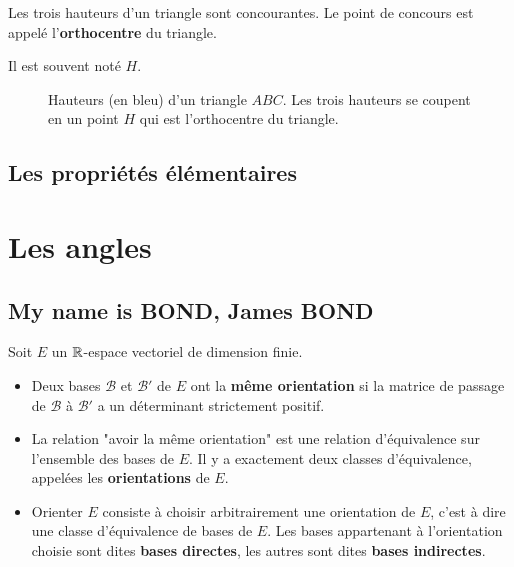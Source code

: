 \documentclass[a4paper,12pt]{article}
\begin{document}
\begin{theoreme}{}{}
    Les trois hauteurs d'un triangle sont concourantes. Le point de concours est appelé l'\textbf{orthocentre} du triangle.
    
    Il est souvent noté $H$.
\end{theoreme}

\tikzexternalenable
\begin{figure}[H]
    \centering
    \resizebox{0.6\textwidth}{!}{%
    
    }
    \caption{Hauteurs (en bleu) d'un triangle $ABC$. Les trois hauteurs se coupent en un point $H$ qui est l'orthocentre du triangle.}
\end{figure}
\tikzexternaldisable

\subsection{Les propriétés élémentaires}

\clearpage

\section{Les angles}

\subsection{My name is BOND, James BOND}

\begin{definition}
    Soit $E$ un $\mathbb{R}$-espace vectoriel de dimension finie.

    \begin{itemize}
        \item Deux bases $\mathcal{B}$ et $\mathcal{B}'$ de $E$ ont la \textbf{même orientation} si la matrice de passage de $\mathcal{B}$ à $\mathcal{B}'$ a un déterminant strictement positif.
        \item La relation "avoir la même orientation" est une relation d'équivalence sur l'ensemble des bases de $E$. Il y a exactement deux classes d'équivalence, appelées les \textbf{orientations} de $E$.
        \item Orienter $E$ consiste à choisir arbitrairement une orientation de $E$, c'est à dire une classe d'équivalence de bases de $E$.
        Les bases appartenant à l'orientation choisie sont dites \textbf{bases directes}, les autres sont dites \textbf{bases indirectes}.
    \end{itemize}
\end{definition}
\end{document}
